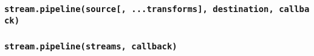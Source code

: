 \begin{Shaded}
\begin{Highlighting}[]
\OperatorTok{=} \OperatorTok{,}\KeywordTok{=\textgreater{}}\NormalTok{ \{}
  \NormalTok{()}\OperatorTok{;}
\NormalTok{\})}\OperatorTok{;}
\end{Highlighting}
\end{Shaded}

\subsubsection{\texorpdfstring{\texttt{stream.pipeline(source{[},\ ...transforms{]},\ destination,\ callback)}}{stream.pipeline(source{[}, ...transforms{]}, destination, callback)}}\label{stream.pipelinesource-...transforms-destination-callback}

\subsubsection{\texorpdfstring{\texttt{stream.pipeline(streams,\ callback)}}{stream.pipeline(streams, callback)}}\label{stream.pipelinestreams-callback}

